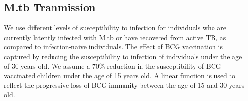 \subsection{M.tb Tranmission}
We use different levels of susceptibility to infection for individuals who are currently latently infected 
with M.tb or have recovered from active TB, as compared to infection-naive individuals. The effect of 
BCG vaccination is captured by reducing the susceptibility to infection of individuals under the age of 
30 years old. We assume a 70\% reduction in the susceptibility of BCG-vaccinated children under the 
age of 15 years old. A linear function is used to reflect the progressive loss of BCG immunity 
between the age of 15 and 30 years old. 
